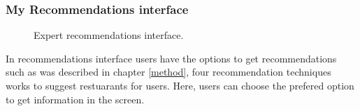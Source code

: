 \subsubsection{My Recommendations interface}
\begin{figure}
\captionsetup{font=footnotesize}
\centering
{}
\caption{Expert recommendations interface.}
\label{fig:expert-recs}   
\end{figure}
In recommendations interface users have the options to get  
recommendations such as was described in chapter \ref{method}, four 
recommendation techniques works to suggest restuarants for 
users. Here, users can choose the prefered option to get 
information in the screen.\\ 

